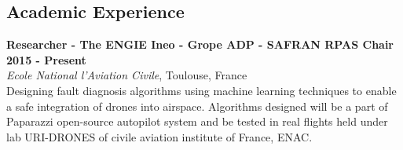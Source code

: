 \documentclass[margin,line]{res}
\newenvironment{list1}{
  \begin{list}{\ding{113}}{
      \setlength{\itemsep}{0in}
      \setlength{\parsep}{0in} \setlength{\parskip}{0in}
      \setlength{\topsep}{0in} \setlength{\partopsep}{0in}
      \setlength{\leftmargin}{0.17in}}}{\end{list}}
\newenvironment{list2}{
  \begin{list}{$\bullet$}{
      \setlength{\itemsep}{0in}
      \setlength{\parsep}{0in} \setlength{\parskip}{0in}
      \setlength{\topsep}{0in} \setlength{\partopsep}{0in}
      \setlength{\leftmargin}{0.2in}}}{\end{list}}
\begin{document}
\begin{resume}
%
%
\section{\sc Academic Experience}

{\bf Researcher - The ENGIE Ineo - Grope ADP - SAFRAN RPAS Chair} \hfill {\bf 2015 - Present}\\
{\em Ecole National l'Aviation Civile}, Toulouse, France \\
Designing fault diagnosis algorithms using machine learning techniques to enable a safe integration of drones into airspace. Algorithms designed will be a part of Paparazzi open-source autopilot system and be tested in real flights held under lab URI-DRONES of civile aviation institute of France, ENAC.


\end{resume}
\end{document}
